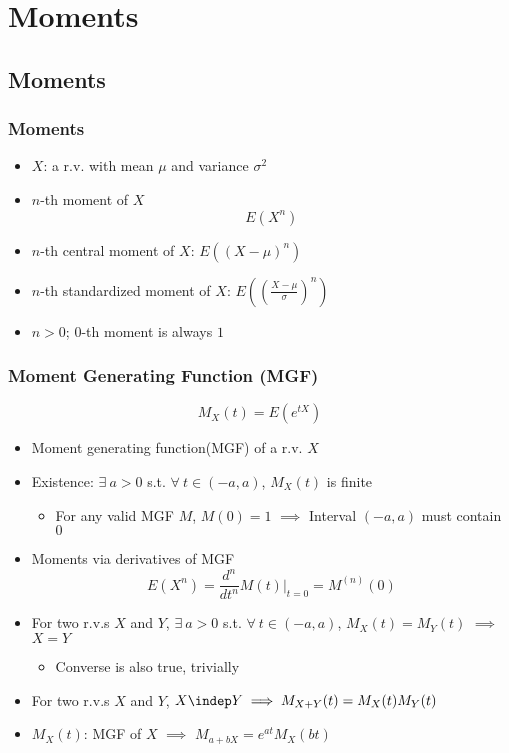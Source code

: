 \section{Moments}

\subsection{Moments}

\subsubsection*{Moments}
\begin{itemize}
    \item $X$: a r.v. with mean $\mu$ and variance $\sigma^2$
    \item $n$-th moment of $X$
    \begin{equation}
        E\left(X^n\right)
    \end{equation}
    \item $n$-th central moment of $X$: $E\left((X-\mu)^n\right)$
    \item $n$-th standardized moment of $X$: $E\left(\left(\frac{X-\mu}{\sigma}\right)^n\right)$
    \item $n>0$; $0$-th moment is always $1$
\end{itemize}

\subsubsection*{Moment Generating Function (MGF)}
\begin{equation}
    M_X(t)=E\left(e^{tX}\right)
\end{equation}
\begin{itemize}
    \item Moment generating function(MGF) of a r.v. $X$
    \item Existence: $\exists~a>0$ s.t. $\forall~t\in(-a,a)$, $M_X(t)$ is finite
    \begin{itemize}
        \item For any valid MGF $M$, $M(0)=1$ $\implies$ Interval $(-a,a)$ must contain $0$
    \end{itemize}
    \item Moments via derivatives of MGF
    \begin{equation}
        E\left(X^n\right)=\frac{d^n}{dt^n}M(t)\Bigr|_{t=0}=M^{(n)}(0)
    \end{equation}
    \item For two r.v.s $X$ and $Y$, $\exists~a>0$ s.t. $\forall~t\in(-a,a)$, $M_X(t)=M_Y(t)$ $\implies$ $X=Y$
    \begin{itemize}
        \item Converse is also true, trivially
    \end{itemize}
    \item For two r.v.s $X$ and $Y$, $X\indep Y\implies M_{X+Y}(t)=M_X(t)M_Y(t)$
    \item $M_X(t)$: MGF of $X$ $\implies$ $M_{a+bX}=e^{at}M_X(bt)$
\end{itemize}

